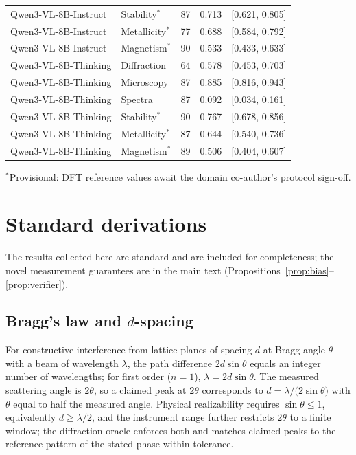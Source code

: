\documentclass[pdflatex,sn-nature]{sn-jnl}
\begin{document}
\begin{table}[h]
{\begin{tabular}{l l S[table-format=3.0] S[table-format=1.3] c}
Qwen3-VL-8B-Instruct & Stability$^{*}$ & 87 & 0.713 & [0.621, 0.805] \\
Qwen3-VL-8B-Instruct & Metallicity$^{*}$ & 77 & 0.688 & [0.584, 0.792] \\
Qwen3-VL-8B-Instruct & Magnetism$^{*}$ & 90 & 0.533 & [0.433, 0.633] \\
\addlinespace
Qwen3-VL-8B-Thinking & Diffraction & 64 & 0.578 & [0.453, 0.703] \\
Qwen3-VL-8B-Thinking & Microscopy & 87 & 0.885 & [0.816, 0.943] \\
Qwen3-VL-8B-Thinking & Spectra & 87 & 0.092 & [0.034, 0.161] \\
Qwen3-VL-8B-Thinking & Stability$^{*}$ & 90 & 0.767 & [0.678, 0.856] \\
Qwen3-VL-8B-Thinking & Metallicity$^{*}$ & 87 & 0.644 & [0.540, 0.736] \\
Qwen3-VL-8B-Thinking & Magnetism$^{*}$ & 89 & 0.506 & [0.404, 0.607] \\
\bottomrule
\end{tabular}}
\end{table}
{\scriptsize $^{*}$Provisional: DFT reference values await the domain co-author's protocol sign-off.}

\appendix
\section{Standard derivations}\label{app:standard}
The results collected here are standard and are included for completeness; the novel
measurement guarantees are in the main text (Propositions~\ref{prop:bias}--\ref{prop:verifier}).

\subsection{Bragg's law and \texorpdfstring{$d$}{d}-spacing}
For constructive interference from lattice planes of spacing $d$ at Bragg angle
$\theta$ with a beam of wavelength $\lambda$, the path difference $2d\sin\theta$ equals an
integer number of wavelengths; for first order ($n=1$), $\lambda=2d\sin\theta$. The
measured scattering angle is $2\theta$, so a claimed peak at $2\theta$ corresponds to
$d=\lambda/\!\big(2\sin\theta\big)$ with $\theta$ equal to half the measured angle.
Physical realizability requires $\sin\theta\le1$, equivalently $d\ge\lambda/2$, and the
instrument range further restricts $2\theta$ to a finite window; the diffraction oracle
enforces both and matches claimed peaks to the reference pattern of the stated phase
within tolerance.
\end{document}
